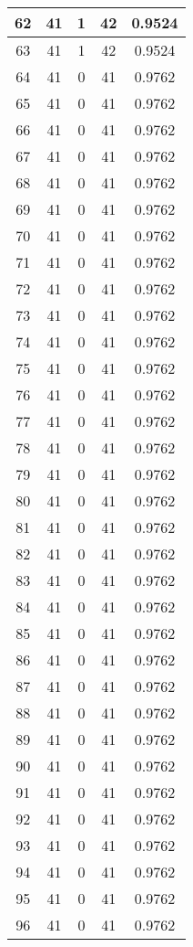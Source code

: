 \documentclass[letterpaper, 12pt]{article}
\begin{document}
\begin{longtable}{|c|c|c|c|c|}
\hline
62 & 41 & 1 & 42 & 0.9524 \\
\hline
63 & 41 & 1 & 42 & 0.9524 \\
\hline
64 & 41 & 0 & 41 & 0.9762 \\
\hline
65 & 41 & 0 & 41 & 0.9762 \\
\hline
66 & 41 & 0 & 41 & 0.9762 \\
\hline
67 & 41 & 0 & 41 & 0.9762 \\
\hline
68 & 41 & 0 & 41 & 0.9762 \\
\hline
69 & 41 & 0 & 41 & 0.9762 \\
\hline
70 & 41 & 0 & 41 & 0.9762 \\
\hline
71 & 41 & 0 & 41 & 0.9762 \\
\hline
72 & 41 & 0 & 41 & 0.9762 \\
\hline
73 & 41 & 0 & 41 & 0.9762 \\
\hline
74 & 41 & 0 & 41 & 0.9762 \\
\hline
75 & 41 & 0 & 41 & 0.9762 \\
\hline
76 & 41 & 0 & 41 & 0.9762 \\
\hline
77 & 41 & 0 & 41 & 0.9762 \\
\hline
78 & 41 & 0 & 41 & 0.9762 \\
\hline
79 & 41 & 0 & 41 & 0.9762 \\
\hline
80 & 41 & 0 & 41 & 0.9762 \\
\hline
81 & 41 & 0 & 41 & 0.9762 \\
\hline
82 & 41 & 0 & 41 & 0.9762 \\
\hline
83 & 41 & 0 & 41 & 0.9762 \\
\hline
84 & 41 & 0 & 41 & 0.9762 \\
\hline
85 & 41 & 0 & 41 & 0.9762 \\
\hline
86 & 41 & 0 & 41 & 0.9762 \\
\hline
87 & 41 & 0 & 41 & 0.9762 \\
\hline
88 & 41 & 0 & 41 & 0.9762 \\
\hline
89 & 41 & 0 & 41 & 0.9762 \\
\hline
90 & 41 & 0 & 41 & 0.9762 \\
\hline
91 & 41 & 0 & 41 & 0.9762 \\
\hline
92 & 41 & 0 & 41 & 0.9762 \\
\hline
93 & 41 & 0 & 41 & 0.9762 \\
\hline
94 & 41 & 0 & 41 & 0.9762 \\
\hline
95 & 41 & 0 & 41 & 0.9762 \\
\hline
96 & 41 & 0 & 41 & 0.9762 \\

\end{longtable}
\end{document}
